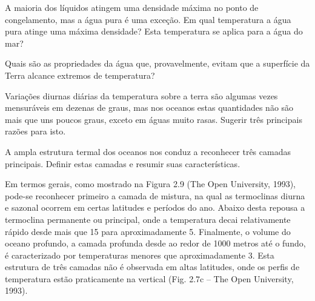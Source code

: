 \begin{questions}
  A maioria dos líquidos atingem uma densidade máxima no ponto de congelamento,
  mas a água pura é uma exceção.  Em qual temperatura a água pura atinge uma
  máxima densidade?  Esta temperatura se aplica para a água do mar?
\end{questions}

\begin{questions}
  Quais são as propriedades da água que, provavelmente, evitam que a superfície
  da Terra alcance extremos de temperatura?

\end{questions}

\begin{questions}
  Variações diurnas diárias da temperatura sobre a terra são algumas vezes
  mensuráveis em dezenas de graus, mas nos oceanos estas quantidades não são
  mais que uns poucos graus, exceto em águas muito rasas.  Sugerir três principais
  razões para isto.
\end{questions}

\begin{questions}
  A ampla estrutura termal dos oceanos nos conduz a reconhecer três camadas
  principais.  Definir estas camadas e resumir suas características.

  \begin{solution}
    Em termos gerais, como mostrado na Figura 2.9 (The Open University, 1993),
    pode-se reconhecer primeiro a camada de mistura, na qual as termoclinas diurna e
    sazonal ocorrem em certas latitudes e períodos do ano.  Abaixo desta repousa a
    termoclina permanente ou principal, onde a temperatura decai relativamente
    rápido desde mais que 15\textcelsius{} para aproximadamente 5\textcelsius{}.
    Finalmente, o volume do oceano profundo, a camada profunda desde ao redor de
    1000 metros até o fundo, é caracterizado por temperaturas  menores que
    aproximadamente 3\textcelsius{}.  Esta estrutura de três camadas não é observada
    em altas latitudes, onde os perfis de temperatura estão praticamente na vertical
    (Fig. 2.7c – The Open University, 1993).
  \end{solution}
\end{questions}

